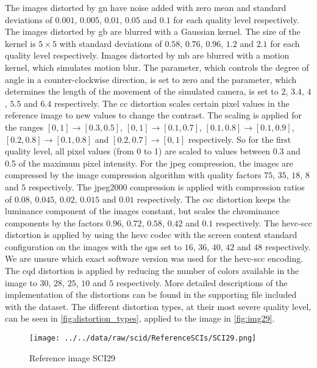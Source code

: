The images distorted by \gls{gn} have noise added with zero mean and standard deviations of $0.001$, $0.005$, $0.01$, $0.05$ and $0.1$ for each quality level respectively.
The images distorted by \gls{gb} are blurred with a Gaussian kernel.
The size of the kernel is $5\times5$ with standard deviations of $0.58$, $0.76$, $0.96$, $1.2$ and $2.1$ for each quality level respectively.
Images distorted by \gls{mb} are blurred with a motion kernel, which simulates motion blur.
The parameter, which controls the degree of angle in a counter-clockwise direction, is set to zero and the parameter, which determines the length of the movement of the simulated camera, is set to $2$, $3.4$, $4$, $5.5$ and $6.4$ respectively.
The \gls{cc} distortion scales certain pixel values in the reference image to new values to change the contrast.
The scaling is applied for the ranges $[0,1] \rightarrow [0.3,0.5]$, $[0,1] \rightarrow [0.1,0.7]$, $[0.1,0.8] \rightarrow [0.1,0.9]$, $[0.2,0.8] \rightarrow [0.1,0.8]$ and $[0.2,0.7] \rightarrow [0,1]$ respectively.
So for the first quality level, all pixel values (from 0 to 1) are scaled to values between 0.3 and 0.5 of the maximum pixel intensity.
For the \gls{jpeg} compression, the images are compressed by the image compression algorithm with quality factors $75$, $35$, $18$, $8$ and $5$ respectively.
The \gls{jpeg}2000 compression is applied with compression ratios of $0.08$, $0.045$, $0.02$, $0.015$ and $0.01$ respectively.
The \gls{csc} distortion keeps the luminance component of the images constant, but scales the chrominance components by the factors $0.96$, $0.72$, $0.58$, $0.42$ and $0.1$ respectively.
The \gls{hevc}-\gls{scc} distortion is applied by using the \gls{hevc} codec with the screen content standard configuration on the images with the \glspl{qp} set to $16$, $36$, $40$, $42$ and $48$ respectively.
We are unsure which exact software version was used for the \gls{hevc}-\gls{scc} encoding.
The \gls{cqd} distortion is applied by reducing the number of colors available in the image to $30$, $28$, $25$, $10$ and $5$ respectively.
More detailed descriptions of the implementation of the distortions can be found in the supporting file included with the dataset.
The different distortion types, at their most severe quality level, can be seen in \autoref{fig:distortion_types}, applied to the image in \autoref{fig:img29}.

\begin{figure}[h!]
    \centering
    \texttt{[image: ../../data/raw/scid/ReferenceSCIs/SCI29.png]}
    \caption{Reference image SCI29}
    \label{fig:img29}
\end{figure}

